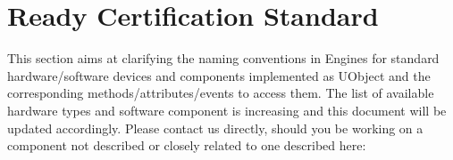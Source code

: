 \newcommand{\slot}[2]{%
  \lstindex{#1} & #2 \\\hline%
}%

\newcommand{\optSlot}[2]{%
  \cellcolor{verylightgray}[\lstindex{#1}] & #2 \\\hline%
}%

\newenvironment{slotsOrEvents}[1]
{%
  \tablehead{%
    \hline%
    \textbf{#1} &%
    \textbf{Description}\\\hline%
  }%
  \begin{supertabular}{|m{.15\textwidth}|m{.8\textwidth}|}%
  }{%
  \end{supertabular}%
}

\newenvironment{slots}
{%
  \begin{slotsOrEvents}{Slot}%
  }{%
  \end{slotsOrEvents}%
}

\newenvironment{events}
{%
  \begin{slotsOrEvents}{Event}%
  }{%
  \end{slotsOrEvents}%
}

\newcommand{\refFacet}[2][]%
  {\hyperref[sec:facet:#2]{\lstinline|#2|#1 (\autoref*{sec:facet:#2})}}

\newcommand{\facet}[2][]{%
  \ifthenelse{\equal{#1}{}}{%
    \subsection{#2\index{#2@\lstinline{#2}}}%
  }{%
    \subsection{#2 (subclass of #1)\index{#2@\lstinline{#2}}}%
  }%
  \label{sec:facet:#2}
}


\chapter{\urbi Ready Certification Standard}
\label{sec:naming}


This section aims at clarifying the naming conventions in \urbi
Engines for standard hardware/software devices and components
implemented as UObject and the corresponding methods/attributes/events
to access them. The list of available hardware types and software
component is increasing and this document will be updated
accordingly. Please contact us directly, should you be working on a
component not described or closely related to one described here:

\begin{center}
\end{center}

